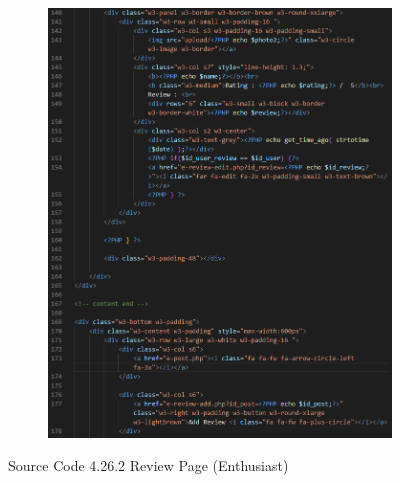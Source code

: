 \begin{enumerate}[1.]
\begin{figure}[h]
\begin{subfigure}[b]{0.8\textwidth}
            \includegraphics[width=\textwidth]{mainmatter/images/frontend/code/ereview3.png}
            \label{fig:sub3}
        \end{subfigure}
        \caption*{Source Code 4.26.2 Review Page (Enthusiast)}
        \label{fig:myfig65b}
    \end{figure}
    \clearpage


\end{enumerate}
